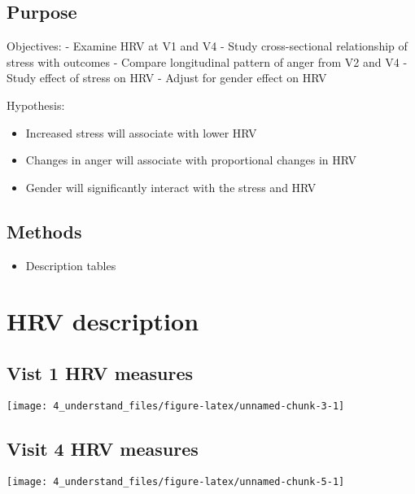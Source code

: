 \documentclass[10pt,]{tufte-handout}
\providecommand{\tightlist}{%
  \setlength{\itemsep}{0pt}\setlength{\parskip}{0pt}}
\begin{document}
\hypertarget{purpose}{%
\subsection{Purpose}\label{purpose}}

Objectives: - Examine HRV at V1 and V4 - Study cross-sectional
relationship of stress with outcomes - Compare longitudinal pattern of
anger from V2 and V4 - Study effect of stress on HRV - Adjust for gender
effect on HRV

Hypothesis:

\begin{itemize}
\tightlist
\item
  Increased stress will associate with lower HRV
\item
  Changes in anger will associate with proportional changes in HRV
\item
  Gender will significantly interact with the stress and HRV
\end{itemize}

\hypertarget{methods}{%
\subsection{Methods}\label{methods}}

\begin{itemize}
\tightlist
\item
  Description tables
\end{itemize}

\hypertarget{hrv-description}{%
\section{HRV description}\label{hrv-description}}

\hypertarget{vist-1-hrv-measures}{%
\subsection{Vist 1 HRV measures}\label{vist-1-hrv-measures}}

\texttt{[image: 4\_understand\_files/figure-latex/unnamed-chunk-3-1]}

\hypertarget{visit-4-hrv-measures}{%
\subsection{Visit 4 HRV measures}\label{visit-4-hrv-measures}}

\texttt{[image: 4\_understand\_files/figure-latex/unnamed-chunk-5-1]}
\end{document}
